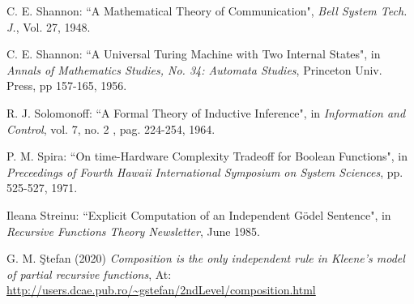 {\begin{thebibliography}{}
 C. E. Shannon: ``A Mathematical Theory of Communication", {\em Bell System Tech. J.}, Vol. 27, 1948.

 C. E. Shannon: ``A Universal Turing Machine with Two Internal States", in {\em Annals of Mathematics Studies, No. 34: Automata Studies}, Princeton Univ. Press, pp 157-165, 1956.



 R. J. Solomonoff: ``A Formal Theory of Inductive Inference", in {\em Information and Control}, vol. 7, no. 2 , pag. 224-254, 1964.

 P. M. Spira: ``On time-Hardware Complexity Tradeoff for Boolean Functions", in {\em Preceedings of Fourth Hawaii International Symposium on System Sciences}, pp. 525-527, 1971.


 Ileana Streinu: ``Explicit Computation of an Independent G\"{o}del Sentence", in {\em Recursive Functions Theory Newsletter}, June 1985.

    G. M. \c Stefan (2020) {\em Composition is the only independent rule in Kleene's model of partial recursive functions}, At: \url{http://users.dcae.pub.ro/~gstefan/2ndLevel/composition.html}





\end{thebibliography}}
